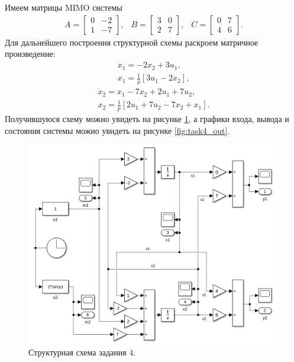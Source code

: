 Имеем матрицы MIMO системы
\begin{equation*}
    \begin{array}{ccc}
        A=\begin{bmatrix}
            0&-2\\1&-7
        \end{bmatrix},&
        B=\begin{bmatrix}
            3&0\\2&7
        \end{bmatrix},&
        C=\begin{bmatrix}
            0&7\\4&6
        \end{bmatrix}.
    \end{array}
\end{equation*}
Для дальнейшего построения структурной схемы раскроем матричное произведение:
\begin{equation*}
    \begin{array}{c}
        \dot x_1=-2x_2+3u_1,\\[2mm]
        x_1=\frac{1}{p}[3u_1-2x_2],
    \end{array}
\end{equation*}
\begin{equation*}
    \begin{array}{c}
        \dot x_2=x_1-7x_2+2u_1+7u_2,\\[2mm]
        x_2=\frac{1}{p}[2u_1+7u_2-7x_2+x_1].
    \end{array}
\end{equation*}
Получившуюся схему можно увидеть на рисунке \ref{fig:task4_slx}, а графики входа,
вывода и состояния системы можно увидеть на рисунке \ref{fig:task4_out}.
\begin{figure}[htbp]
    \centering
    \includegraphics[width=1\linewidth]{figs/task_4_slx.png}
    \caption{Структурная схема задания 4.}
    \label{fig:task4_slx}
\end{figure}

